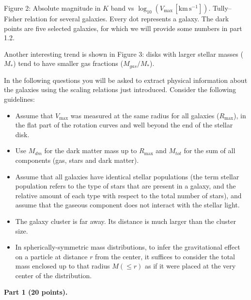 
{\centering\small Figure 2: Absolute magnitude in $K$ band vs
$\log_{10}(V_{\max}\,[\mathrm{km\,s^{-1}}])$. Tully--Fisher relation for
several galaxies. Every dot represents a galaxy. The dark points are five
selected galaxies, for which we will provide some numbers in part 1.2.\par}

Another interesting trend is shown in Figure 3: disks with larger stellar
masses ($M_*$) tend to have smaller gas fractions ($M_{gas}/M_*$).


In the following questions you will be asked to extract physical information
about the galaxies using the scaling relations just introduced. Consider the
following guidelines:
\begin{itemize}
\item Assume that $V_{\max}$ was measured at the same radius for all galaxies
  ($R_{\max}$), in the flat part of the rotation curves and well beyond the
  end of the stellar disk.
\item Use $M_{dm}$ for the dark matter mass up to $R_{\max}$ and $M_{tot}$
  for the sum of all components (gas, stars and dark matter).
\item Assume that all galaxies have identical stellar populations (the term
  stellar population refers to the type of stars that are present in a
  galaxy, and the relative amount of each type with respect to the total
  number of stars), and assume that the gaseous component does not interact
  with the stellar light.
\item The galaxy cluster is far away. Its distance is much larger than the
  cluster size.
\item In spherically-symmetric mass distributions, to infer the gravitational
  effect on a particle at distance $r$ from the center, it suffices to
  consider the total mass enclosed up to that radius $M(\leq r)$ as if it
  were placed at the very center of the distribution.
\end{itemize}

\medskip
\textbf{Part 1 (20 points).}

